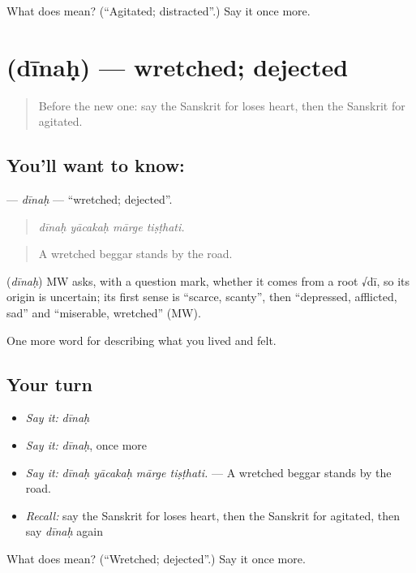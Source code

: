 \begin{tcolorbox}[breakable,colback=teal!4,colframe=teal!35!black,title={Before you move on}]
What does  mean? (\textquotedblleft{}Agitated; distracted\textquotedblright{}.) Say it once more.
\end{tcolorbox}
\section[\texorpdfstring{\sk{दीनः} (dīnaḥ)}{दीनः (dīnaḥ)}]{ (dīnaḥ) — wretched; dejected}

\label{lesson:SA-C452-dinah}



\begin{quote}
Before the new one: say the Sanskrit for loses heart, then the Sanskrit for agitated.
\end{quote}

\subsection*{You'll want to know: }
\textbf{} — \emph{dīnaḥ} — \textquotedblleft{}wretched; dejected\textquotedblright{}.

\begin{quote}
   
\end{quote}

\begin{quote}
\emph{dīnaḥ yācakaḥ mārge tiṣṭhati.}
\end{quote}

\begin{quote}
A wretched beggar stands by the road.
\end{quote}

\begin{cousinweb}
\textbf{} (\emph{dīnaḥ}) MW asks, with a question mark, whether it comes from a root √dī, so its origin is uncertain; its first sense is \textquotedblleft{}scarce, scanty\textquotedblright{}, then \textquotedblleft{}depressed, afflicted, sad\textquotedblright{} and \textquotedblleft{}miserable, wretched\textquotedblright{} (MW).
\end{cousinweb}

\begin{grammarlens}[title={What you've built}]
One more word for describing what you lived and felt.
\end{grammarlens}

\subsection*{Your turn}
\begin{itemize}
\raggedright
  \item \emph{Say it:} \emph{dīnaḥ}
  \item \emph{Say it:} \emph{dīnaḥ}, once more
  \item \emph{Say it:} \emph{dīnaḥ yācakaḥ mārge tiṣṭhati.} — A wretched beggar stands by the road.
  \item \emph{Recall:} say the Sanskrit for loses heart, then the Sanskrit for agitated, then say \emph{dīnaḥ} again
\end{itemize}

\begin{tcolorbox}[breakable,colback=teal!4,colframe=teal!35!black,title={Before you move on}]
What does  mean? (\textquotedblleft{}Wretched; dejected\textquotedblright{}.) Say it once more.
\end{tcolorbox}
